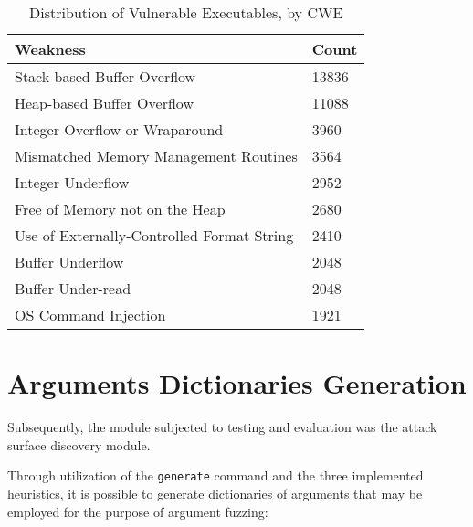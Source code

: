 \documentclass[../main.tex]{subfiles}
\begin{document}
\begin{table}[]
\centering
\begin{tabular}{|l|l|}
\hline
Weakness                                   & Count \\ \hline
Stack-based Buffer Overflow                & 13836 \\ \hline
Heap-based Buffer Overflow                 & 11088 \\ \hline
Integer Overflow or Wraparound             & 3960  \\ \hline
Mismatched Memory Management Routines      & 3564  \\ \hline
Integer Underflow                          & 2952  \\ \hline
Free of Memory not on the Heap             & 2680  \\ \hline
Use of Externally-Controlled Format String & 2410  \\ \hline
Buffer Underflow                           & 2048  \\ \hline
Buffer Under-read                          & 2048  \\ \hline
OS Command Injection                       & 1921  \\ \hline
\end{tabular}
\caption{\label{executables-distribution}Distribution of Vulnerable Executables, by CWE}
\end{table}

\hypertarget{arguments-dictionaries-generation}{%
  \section{Arguments Dictionaries
    Generation}\label{arguments-dictionaries-generation}}

Subsequently, the module subjected to testing and evaluation was the attack
surface discovery module.

Through utilization of the \texttt{generate} command and the three implemented
heuristics, it is possible to generate dictionaries of arguments that may be
employed for the purpose of argument fuzzing:
\end{document}
